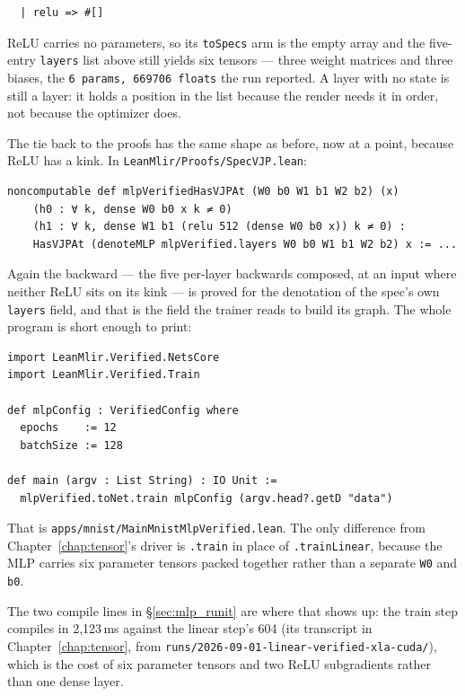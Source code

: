 \begin{verbatim}
  | relu => #[]
\end{verbatim}

\noindent ReLU carries no parameters, so its \texttt{toSpecs} arm is the
empty array and the five-entry \texttt{layers} list above still yields
six tensors --- three weight matrices and three biases, the
\texttt{6 params, 669706 floats} the run reported. A layer with no state
is still a layer: it holds a position in the list because the
render needs it in order, not because the optimizer does.

The tie back to the proofs has the same shape as before, now at a point,
because ReLU has a kink. In \texttt{LeanMlir/Proofs/SpecVJP.lean}:

\begin{verbatim}
noncomputable def mlpVerifiedHasVJPAt (W0 b0 W1 b1 W2 b2) (x)
    (h0 : ∀ k, dense W0 b0 x k ≠ 0)
    (h1 : ∀ k, dense W1 b1 (relu 512 (dense W0 b0 x)) k ≠ 0) :
    HasVJPAt (denoteMLP mlpVerified.layers W0 b0 W1 b1 W2 b2) x := ...
\end{verbatim}

Again the backward --- the five per-layer backwards composed, at an input
where neither ReLU sits on its kink --- is proved for the denotation of the
spec's own \texttt{layers} field, and that is the field the trainer reads
to build its graph. The whole program is short enough to print:

\begin{verbatim}
import LeanMlir.Verified.NetsCore
import LeanMlir.Verified.Train

def mlpConfig : VerifiedConfig where
  epochs    := 12
  batchSize := 128

def main (argv : List String) : IO Unit :=
  mlpVerified.toNet.train mlpConfig (argv.head?.getD "data")
\end{verbatim}

That is \texttt{apps/mnist/MainMnistMlpVerified.lean}. The only
difference from Chapter~\ref{chap:tensor}'s driver is \texttt{.train} in
place of \texttt{.trainLinear}, because the MLP carries six parameter
tensors packed together rather than a separate \texttt{W0} and
\texttt{b0}.

The two compile lines in \S\ref{sec:mlp_runit} are where that shows up:
the train step compiles in 2,123\,ms against the linear step's 604 (its
transcript in Chapter~\ref{chap:tensor}, from
\texttt{runs/2026-09-01-linear-verified-xla-cuda/}), which is the cost of six parameter tensors
and two ReLU subgradients rather than one dense layer.

